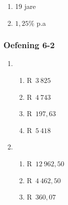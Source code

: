 {\begin{multicols}{3}
\begin{enumerate}[noitemsep, label=\textbf{\arabic*}.]
\begin{enumerate}[noitemsep, label=\textbf{(\alph*)} ]
	    \item R~$3~937,50$ %
	\end{enumerate}

	\item 19 jare %

	\item $1,25\%$ p.a%
    \end{enumerate}


\subsubsection*{Oefening 6-2} %

    \begin{enumerate}[label=\textbf{\arabic*}.]
	\item %
	\begin{enumerate}[noitemsep, label=\textbf{(\alph*)} ]
	    \item R~$3~825$%
	    \item R~$4~743$%
	    \item R~$197,63$%
	    \item R~$5~418$%
	\end{enumerate}


	\item %
	\begin{enumerate}[noitemsep, label=\textbf{(\alph*)} ]
	    \item R~$12~962,50$%
	    \item R~$4~462,50$ %
	    \item R~$360,07$%
	\end{enumerate}


\end{enumerate}
\end{multicols}}
